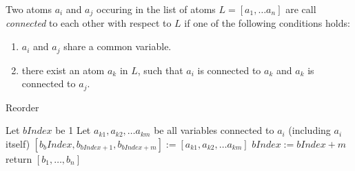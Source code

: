 \documentclass{llncs}
\title{}
\author{}
\begin{document}
\begin{definition}
{\rm
 Two atoms $a_i$ and $a_j$ occuring in the list of atoms $L=[a_1,\dots a_n]$ are call \textit{connected} to each other with respect to $L$  if one of the following conditions holds:
 \begin{enumerate}
  \item $a_i$ and $a_j$ share a common variable.
  \item there exist an atom $a_k$ in $L$, such that $a_i$ is connected to $a_k$ and $a_k$ is connected to $a_j$.
 \end{enumerate}
}
\end{definition}

\begin{algorithm2e}[H]\caption{Reorder}
 \DontPrintSemicolon
  
  Let $bIndex$ be 1 \;
  {
    {
       Let $a_{k1},a_{k2},\dots a_{km}$ be all variables connected to $a_i$ (including $a_i$ itself)
       $[b_bIndex,b_{bIndex+1},b_{bIndex+m}]:=[a_{k1},a_{k2},\dots a_{km}]$ \;
       $bIndex:=bIndex+m$ \;
    }
    return $[b_1,\dots, b_n]$
  } 
\end{algorithm2e}

  
\end{document}
